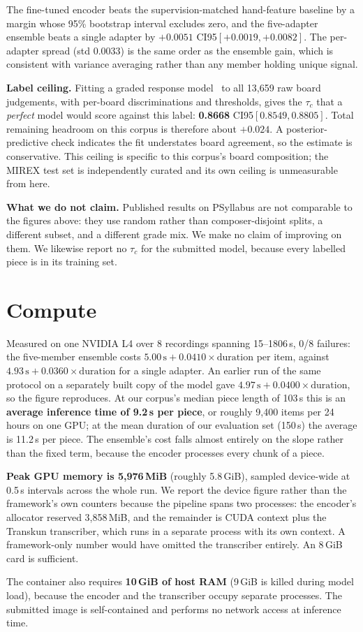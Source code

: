 \documentclass{article}
\begin{document}
The fine-tuned encoder beats the supervision-matched hand-feature baseline by a
margin whose 95\% bootstrap interval excludes zero, and the five-adapter
ensemble beats a single adapter by $+0.0051$ CI95$[+0.0019,+0.0082]$. The
per-adapter spread (std 0.0033) is the same order as the ensemble gain, which
is consistent with variance averaging rather than any member holding unique
signal.

\textbf{Label ceiling.} Fitting a graded response model~\cite{samejima1969grm}
to all 13{,}659 raw board judgements, with per-board discriminations and
thresholds, gives the $\tau_c$ that a \emph{perfect} model would score against
this label: \textbf{0.8668} CI95$[0.8549, 0.8805]$. Total remaining headroom on
this corpus is therefore about $+0.024$. A posterior-predictive check indicates
the fit understates board agreement, so the estimate is conservative. This
ceiling is specific to this corpus's board composition; the MIREX test set is
independently curated and its own ceiling is unmeasurable from here.

\textbf{What we do not claim.} Published results on PSyllabus are not
comparable to the figures above: they use random rather than composer-disjoint
splits, a different subset, and a different grade mix. We make no claim of
improving on them. We likewise report no $\tau_c$ for the submitted model,
because every labelled piece is in its training set.

\section{Compute}\label{sec:compute}

Measured on one NVIDIA L4 over 8 recordings spanning 15--1806\,s, 0/8 failures:
the five-member ensemble costs $5.00\,\mathrm{s} + 0.0410 \times
\mathrm{duration}$ per item, against $4.93\,\mathrm{s} + 0.0360 \times
\mathrm{duration}$ for a single adapter. An earlier run of the same protocol on
a separately built copy of the model gave $4.97\,\mathrm{s} + 0.0400 \times
\mathrm{duration}$, so the figure reproduces. At our corpus's median piece length of
103\,s this is an \textbf{average inference time of 9.2\,s per piece}, or
roughly 9{,}400 items per 24 hours on one GPU; at the mean duration of our
evaluation set (150\,s) the average is 11.2\,s per piece. The ensemble's cost
falls almost entirely on the slope rather than the fixed term, because the
encoder processes every chunk of a piece.

\textbf{Peak GPU memory is 5{,}976\,MiB} (roughly 5.8\,GiB), sampled
device-wide at 0.5\,s intervals across the whole run. We report the device
figure rather than the framework's own counters because the pipeline spans two
processes: the encoder's allocator reserved 3{,}858\,MiB, and the remainder is
CUDA context plus the Transkun transcriber, which runs in a separate process
with its own context. A framework-only number would have omitted the
transcriber entirely. An 8\,GiB card is sufficient.

The container also requires \textbf{10\,GiB of host RAM} (9\,GiB is killed
during model load), because the encoder and the transcriber occupy separate
processes. The submitted image is self-contained and performs no network access
at inference time.


\end{document}
